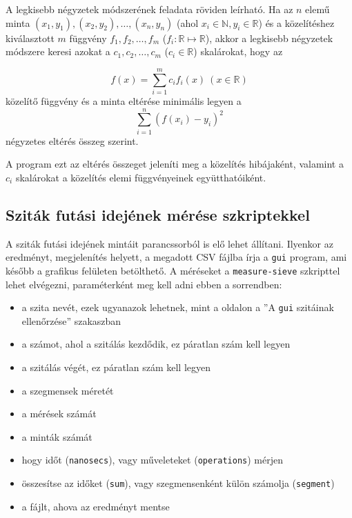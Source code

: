 A legkisebb négyzetek módszerének feladata röviden leírható.
Ha az $n$ elemű minta $(x_1, y_1), (x_2, y_2), \ldots, (x_n, y_n)$ (ahol $x_i \in \mathbb{N}, y_i \in \mathbb{R}$) és a közelítéshez kiválasztott $m$ függvény $f_1, f_2, \ldots, f_m$ ($f_i:\mathbb{R} \mapsto \mathbb{R}$), akkor a legkisebb négyzetek módszere keresi azokat a $c_1, c_2, \ldots, c_m$ ($c_i \in \mathbb{R}$) skalárokat, hogy az

\begin{equation*}
f(x)=\sum_{i=1}^m c_i f_i(x)\ (x \in \mathbb{R})
\end{equation*}
közelítő függvény és a minta eltérése minimális legyen a
\begin{equation*}
\sum_{i=1}^{n} (f(x_i)-y_i)^2
\end{equation*}
négyzetes eltérés összeg szerint.

A program ezt az eltérés összeget jeleníti meg a közelítés hibájaként, valamint a $c_i$ skalárokat a közelítés elemi függvényeinek együtthatóiként.

\subsection{Sziták futási idejének mérése szkriptekkel}

A sziták futási idejének mintáit parancssorból is elő lehet állítani.
Ilyenkor az eredményt, megjelenítés helyett, a megadott CSV fájlba írja a \texttt{gui} program, ami később a grafikus felületen betölthető.
A méréseket a \texttt{measure-sieve} szkripttel lehet elvégezni, paraméterként meg kell adni ebben a sorrendben:
\begin{itemize}
\item a szita nevét, ezek ugyanazok lehetnek, mint a \pageref{sec:szitak-ellenorzese} oldalon a ''A \texttt{gui} szitáinak ellenőrzése'' szakaszban
\item a számot, ahol a szitálás kezdődik, ez páratlan szám kell legyen
\item a szitálás végét, ez páratlan szám kell legyen
\item a szegmensek méretét
\item a mérések számát
\item a minták számát
\item hogy időt (\texttt{nanosecs}), vagy műveleteket (\texttt{operations}) mérjen
\item összesítse az időket (\texttt{sum}), vagy szegmensenként külön számolja (\texttt{segment})
\item a fájlt, ahova az eredményt mentse
\end{itemize}

